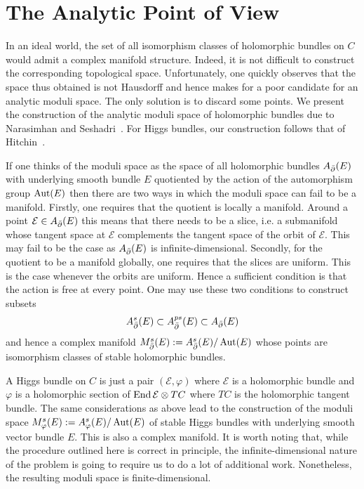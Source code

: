 \documentclass[12pt]{ociamthesis}  %
\begin{document}
\section{The Analytic Point of View}

In an ideal world, the set of all isomorphism classes of holomorphic bundles
on $C$ would admit a complex manifold structure. Indeed, it is not difficult
to construct the corresponding topological space. Unfortunately, one
quickly observes that the space thus obtained is not Hausdorff and hence
makes for a poor candidate for an analytic moduli space.
The only solution is to discard some points. We present
the construction of the analytic moduli space of holomorphic bundles
due to Narasimhan and Seshadri~\cite{ns1964}. For Higgs bundles, our
construction follows that of Hitchin~\cite{hitchin1987}.

If one thinks of the moduli space as the space of all holomorphic bundles
$A_{{\bar{\partial}}}(E)$ with underlying smooth bundle $E$ quotiented by the action
of the automorphism group $\operatorname{Aut}(E)$ then there are two ways in which
the moduli space can fail to be a manifold. Firstly, one requires that
the quotient is locally a manifold. Around a point $\mathcal E\in A_{\bar{\partial}}(E)$
this means that there needs to be a slice, i.e. a submanifold whose
tangent space at $\mathcal E$ complements the tangent space of the orbit
of $\mathcal E$. This may fail to be the case as $A_{\bar{\partial}}(E)$ is
infinite-dimensional. Secondly, for the quotient to be a manifold
globally, one requires that the slices are uniform. This is the case
whenever the orbits are uniform. Hence a sufficient condition is that
the action is free at every point.
One may use these two conditions to construct subsets
\begin{align*}
  A^s_{\bar{\partial}}(E) \subset A^{ps}_{\bar{\partial}}(E) \subset A_{\bar{\partial}}(E)
\end{align*}
and hence a complex manifold $M_{\bar{\partial}}^s(E) := A^s_{\bar{\partial}}(E) / \operatorname{Aut}(E)$
whose points are isomorphism classes of stable holomorphic bundles.

A Higgs bundle on $C$ is just a pair $(\mathcal E,\varphi)$
where $\mathcal E$ is a holomorphic bundle and $\varphi$ is a
holomorphic section of $\operatorname{End}\mathcal E\otimes TC$ where $TC$ is the
holomorphic tangent bundle. The same considerations as above lead to
the construction of the moduli space $M^s_\varphi(E) := A^s_\varphi(E)/\operatorname{Aut}(E)$
of stable Higgs bundles with underlying smooth vector bundle $E$. This is also a
complex manifold. It is worth noting that, while the procedure outlined
here is correct in principle, the infinite-dimensional nature of the
problem is going to require us to do a lot of additional work.
Nonetheless, the resulting moduli space is finite-dimensional.
\end{document}
